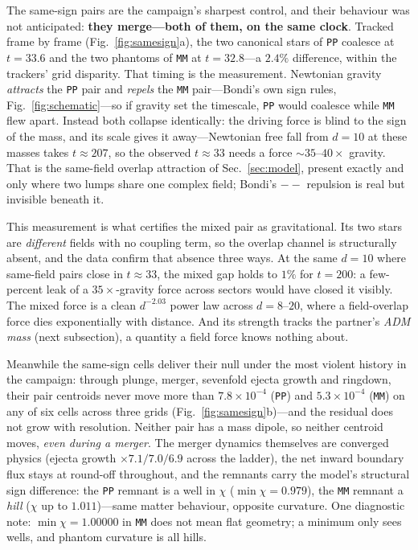 \documentclass[twocolumn,floatfix,aps,prd,nofootinbib]{revtex4-2}
\begin{document}
The same-sign pairs are the campaign's sharpest control, and their behaviour was not anticipated: \textbf{they merge---both of them, on the same clock}. Tracked frame by frame (Fig.~\ref{fig:samesign}a), the two canonical stars of \texttt{PP} coalesce at $t=33.6$ and the two phantoms of \texttt{MM} at $t=32.8$---a $2.4\%$ difference, within the trackers' grid disparity. That timing is the measurement. Newtonian gravity \emph{attracts} the \texttt{PP} pair and \emph{repels} the \texttt{MM} pair---Bondi's own sign rules, Fig.~\ref{fig:schematic}---so if gravity set the timescale, \texttt{PP} would coalesce while \texttt{MM} flew apart. Instead both collapse identically: the driving force is blind to the sign of the mass, and its scale gives it away---Newtonian free fall from $d=10$ at these masses takes $t\approx207$, so the observed $t\approx33$ needs a force ${\sim}35$--$40\times$ gravity. That is the same-field overlap attraction of Sec.~\ref{sec:model}, present exactly and only where two lumps share one complex field; Bondi's $--$ repulsion is real but invisible beneath it.

This measurement is what certifies the mixed pair as gravitational. Its two stars are \emph{different} fields with no coupling term, so the overlap channel is structurally absent, and the data confirm that absence three ways. At the same $d=10$ where same-field pairs close in $t\approx33$, the mixed gap holds to $1\%$ for $t=200$: a few-percent leak of a $35\times$-gravity force across sectors would have closed it visibly. The mixed force is a clean $d^{-2.03}$ power law across $d=8$--$20$, where a field-overlap force dies exponentially with distance. And its strength tracks the partner's \emph{ADM mass} (next subsection), a quantity a field force knows nothing about.

Meanwhile the same-sign cells deliver their null under the most violent history in the campaign: through plunge, merger, sevenfold ejecta growth and ringdown, their pair centroids never move more than $7.8\times10^{-4}$ (\texttt{PP}) and $5.3\times10^{-4}$ (\texttt{MM}) on any of six cells across three grids (Fig.~\ref{fig:samesign}b)---and the residual does not grow with resolution. Neither pair has a mass dipole, so neither centroid moves, \emph{even during a merger}. The merger dynamics themselves are converged physics (ejecta growth $\times7.1/7.0/6.9$ across the ladder), the net inward boundary flux stays at round-off throughout, and the remnants carry the model's structural sign difference: the \texttt{PP} remnant is a well in $\chi$ ($\min\chi=0.979$), the \texttt{MM} remnant a \emph{hill} ($\chi$ up to $1.011$)---same matter behaviour, opposite curvature. One diagnostic note: $\min\chi=1.00000$ in \texttt{MM} does not mean flat geometry; a minimum only sees wells, and phantom curvature is all hills.
\end{document}
